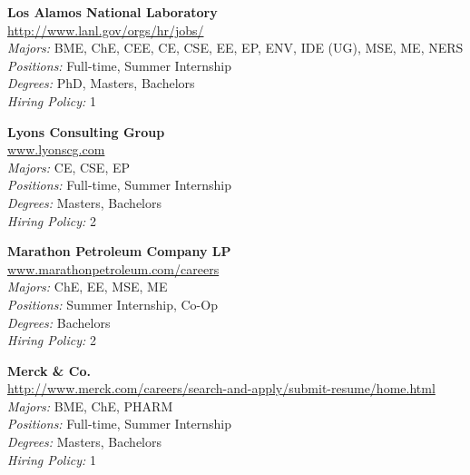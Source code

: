 \documentclass[twoside]{article}
\begin{document}
\begin{center}
\begin{multicols}{3}
\begin{minipage}{.9\columnwidth}{\Large\bf Los Alamos National Laboratory }\\
	\url{http://www.lanl.gov/orgs/hr/jobs/}\\
	\emph{Majors:} BME, ChE, CEE, CE, CSE, EE, EP, ENV, IDE (UG), MSE, ME, NERS\\
	\emph{Positions:} Full-time, Summer Internship\\
	\emph{Degrees:} PhD, Masters, Bachelors\\
	\emph{Hiring Policy:} 1\\
\end{minipage}
 
\begin{minipage}{.9\columnwidth}{\Large\bf Lyons Consulting Group }\\
	\url{www.lyonscg.com}\\
	\emph{Majors:} CE, CSE, EP\\
	\emph{Positions:} Full-time, Summer Internship\\
	\emph{Degrees:} Masters, Bachelors\\
	\emph{Hiring Policy:} 2\\
\end{minipage}
 
\begin{minipage}{.9\columnwidth}{\Large\bf Marathon Petroleum Company LP }\\
	\url{www.marathonpetroleum.com/careers}\\
	\emph{Majors:} ChE, EE, MSE, ME\\
	\emph{Positions:} Summer Internship, Co-Op\\
	\emph{Degrees:} Bachelors\\
	\emph{Hiring Policy:} 2\\
\end{minipage}
 
\begin{minipage}{.9\columnwidth}{\Large\bf Merck \& Co. }\\
	\url{http://www.merck.com/careers/search-and-apply/submit-resume/home.html}\\
	\emph{Majors:} BME, ChE, PHARM\\
	\emph{Positions:} Full-time, Summer Internship\\
	\emph{Degrees:} Masters, Bachelors\\
	\emph{Hiring Policy:} 1\\
\end{minipage}
 

\end{multicols}
\end{center}
\end{document}
